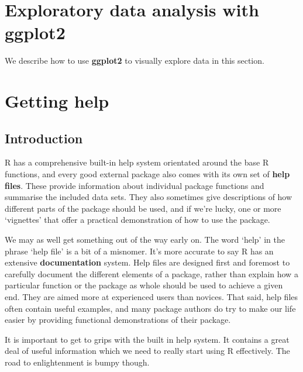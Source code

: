 \documentclass[
]{book}
\begin{document}
\hypertarget{exploratory-data-analysis-with-ggplot2}{%
\chapter{\texorpdfstring{Exploratory data analysis with \textbf{ggplot2}}{Exploratory data analysis with ggplot2}}\label{exploratory-data-analysis-with-ggplot2}}

We describe how to use \textbf{ggplot2} to visually explore data in this section.

\hypertarget{appendix-supplementary-material}{%
\appendix}


\hypertarget{getting-help}{%
\chapter{Getting help}\label{getting-help}}

\hypertarget{console-help}{%
\section{Introduction}\label{console-help}}

R has a comprehensive built-in help system orientated around the base R functions, and every good external package also comes with its own set of \textbf{help files}. These provide information about individual package functions and summarise the included data sets. They also sometimes give descriptions of how different parts of the package should be used, and if we're lucky, one or more `vignettes' that offer a practical demonstration of how to use the package.

We may as well get something out of the way early on. The word `help' in the phrase `help file' is a bit of a misnomer. It's more accurate to say R has an extensive \textbf{documentation} system. Help files are designed first and foremost to carefully document the different elements of a package, rather than explain how a particular function or the package as whole should be used to achieve a given end. They are aimed more at experienced users than novices. That said, help files often contain useful examples, and many package authors do try to make our life easier by providing functional demonstrations of their package.

It is important to get to grips with the built in help system. It contains a great deal of useful information which we need to really start using R effectively. The road to enlightenment is bumpy though.
\end{document}
